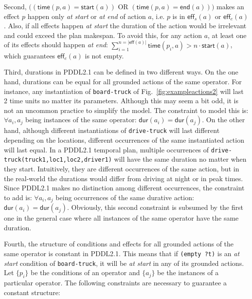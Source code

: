 \documentclass[runningheads]{llncs}
\newcommand{\eff}{\mathsf{eff}}    %
\newcommand{\dur}{\mathsf{dur}}    %
\newcommand{\start}{\mathsf{start}}%
\newcommand{\en}{\mathsf{end}}     %
\newcommand{\tim}{\mathsf{time}}   %
\begin{document}
Second, $((\tim(p,a) = \start(a))$ OR $(\tim(p,a) = \en(a)))$ makes an effect $p$ happen only \emph{at start} or \emph{at end} of action $a$, i.e. $p$ is in $\eff_s(a)$ or $\eff_e(a)$.
Also, if all effects happen \emph{at start} the duration of the action would be irrelevant and could exceed the plan makespan. To avoid this, for any action $a$, at least one of its effects should happen \emph{at end}: $\sum_{i=1}^{n =|\eff(a)|} \tim(p_i,a) > n \cdot \start(a)$, which guarantees $\eff_e(a)$ is not empty.



Third, durations in PDDL2.1 can be defined in two different ways. On the one hand, durations can be equal for all grounded actions of the same operator. For instance, any instantiation of \texttt{board-truck} of Fig.~\ref{fig:exampleactions2} will last 2 time units no matter its parameters. Although this may seem a bit odd, it is not an uncommon practice to simplify the model. The constraint to model this is: $\forall a_i,a_j$ being instances of the same operator: $\dur(a_i) = \dur(a_j)$.
On the other hand, although different instantiations of \texttt{drive-truck} will last different depending on the locations, different occurrences of the same instantiated action will last equal.
In a PDDL2.1 temporal plan, multiple occurrences of \texttt{drive-truck(truck1,loc1,loc2,driver1)} will have the same duration no matter when they start. Intuitively, they are different occurrences of the same action, but in the real-world the durations would differ from driving at night or in peak times. Since PDDL2.1 makes no distinction among different occurrences, the constraint to add is: $\forall a_i,a_j$ being occurrences of the same durative action: $\dur(a_i) = \dur(a_j)$.
Obviously, this second constraint is subsumed by the first one in the general case where all instances of the same operator have the same duration.

Fourth, the structure of conditions and effects for all grounded actions of the same operator is constant in PDDL2.1. This means that if \texttt{(empty ?t)} is an \emph{at start} condition of \texttt{board-truck}, it will be \emph{at start} in any of its grounded actions.
Let $\{p_i\}$ be the conditions of an operator and $\{a_j\}$ be the instances of a particular operator. The following constraints are necessary to guarantee a constant structure:
\end{document}
